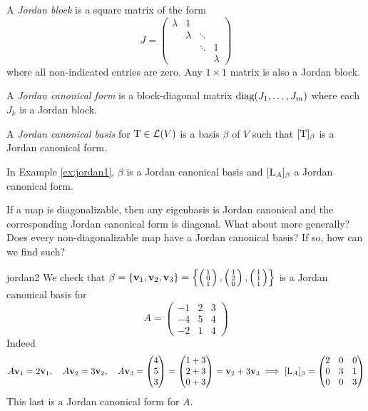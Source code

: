 \begin{defn}{}{}
	A \emph{Jordan block} is a square matrix of the form
	\[
		J=
		\begin{pmatrix}
			\lambda&1&&\\[-2pt]
			&\lambda&\ddots&\\[-2pt]
			&&\ddots&1\\
			&&&\lambda
		\end{pmatrix}
	\]
	where all non-indicated entries are zero. Any $1\times 1$ matrix is also a Jordan block.\par
	A \emph{Jordan canonical form} is a block-diagonal matrix $\operatorname{diag}(J_1,\ldots,J_m)$ where each $J_k$ is a Jordan block.\par
	A \emph{Jordan canonical basis} for $\mathrm{T}\in\mathcal{L}(V)$ is a basis $\beta$ of $V$ such that $[\mathrm{T}]_\beta$ is a Jordan canonical form.\footnotemark
\end{defn}


In Example \ref{ex:jordan1}, $\beta$ is a Jordan canonical basis and $[\mathrm{L}_A]_\beta$ a Jordan canonical form.\smallbreak

If a map is diagonalizable, then any eigenbasis is Jordan canonical and the corresponding Jordan canonical form is diagonal. What about more generally? Does every non-diagonalizable map have a Jordan canonical basis? If so, how can we find such?


\pagebreak[3]


\begin{example}{}{jordan2}
	We check that
	$\beta=\{{\mathbf{v}}_1,{\mathbf{v}}_2,{\mathbf{v}}_3\}=\left\{\left(\begin{smallmatrix}1\\0\\1\end{smallmatrix}\right),\left(\begin{smallmatrix}1\\2\\0\end{smallmatrix}\right),\left(\begin{smallmatrix}1\\1\\1\end{smallmatrix}\right)\right\}$
	is a Jordan canonical basis for 
	\[
		A=
		\begin{pmatrix}
			-1&2&3\\
			-4&5&4\\
			-2&1&4
		\end{pmatrix}
	\]
	Indeed
	\[
		A{\mathbf{v}}_1=2{\mathbf{v}}_1,\quad 
		A{\mathbf{v}}_2=3{\mathbf{v}}_2,\quad 
		A{\mathbf{v}}_3=\begin{pmatrix}4\\5\\3\end{pmatrix}=\begin{pmatrix}1+3\\2+3\\0+3\end{pmatrix}={\mathbf{v}}_2+3{\mathbf{v}}_3\implies [\mathrm{L}_A]_\beta=
		\begin{pmatrix}
			2&0&0\\
			0&3&1\\
			0&0&3
		\end{pmatrix}
	\]
	This last is a Jordan canonical form for $A$.
\end{example}


